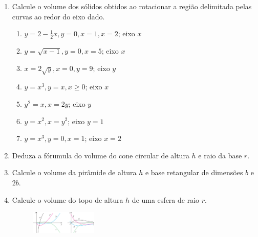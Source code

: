 \documentclass[a4paper,5pt]{amsbook}
\begin{document}
\vspace{1cm}
\begin{enumerate}
    \vspace{0.5cm}
    \item Calcule o volume dos s\'olidos obtidos ao rotacionar a regi\~ao delimitada
    pelas curvas ao redor do eixo dado.
        \begin{enumerate}
            \vspace{0.3cm}
            \item $y=2-\frac{1}{2}x, y=0, x=1, x=2$; eixo $x$
            \vspace{0.3cm}
            \item $y=\sqrt{x-1}, y=0, x=5$; eixo $x$
            \vspace{0.3cm}
            \item $x=2\sqrt{y}, x=0, y=9$; eixo $y$
            \vspace{0.3cm}
            \item $y=x^3, y=x, x\geq 0$; eixo $x$
            \vspace{0.3cm}
            \item $y^2=x, x=2y$; eixo $y$
            \vspace{0.3cm}
            \item $y=x^2, x=y^2$; eixo $y=1$
            \vspace{0.3cm}
            \item $y=x^3, y=0, x=1$; eixo $x=2$
        \end{enumerate}

    \vspace{0.5cm}
    \item Deduza a f\'orumula do volume do cone circular de altura $h$ e raio da
        base $r$.

    \vspace{0.5cm}
    \item Calcule o volume da pir\^amide de altura $h$ e base retangular de
        dimens\~oes $b$ e $2b$.

    \vspace{0.5cm}
    \item Calcule o volume do topo de altura $h$ de uma esfera de raio $r$.
        \begin{figure}[h]
            \includegraphics[width=0.3\textwidth]{lista-13-fig1.png}
        \end{figure}
\end{enumerate}
\end{document}
